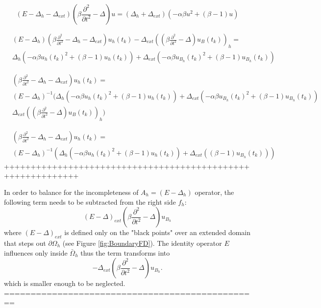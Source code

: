\documentclass[11pt,a4paper,twoside]{article}
\begin{document}
\begin{equation}
(E-\Delta_h -\Delta_{ext})(\beta \frac{ \partial^2 } { \partial t^2 } - \Delta) u =( \Delta_h + \Delta_{ext}) ( -\alpha \beta u^2  + (\beta -1)u) 
\end{equation}

\begin{align}
&(E-\Delta_h)(\beta \frac{ \partial^2 } { \partial t^2 } - \Delta_h - \Delta_{ext}) u_h(t_k) - \Delta_{ext}((\beta \frac{ \partial^2 } { \partial t^2 } - \Delta)u_B(t_k))_h = 
\\
&\Delta_h ( -\alpha \beta u_h(t_k)^2  + (\beta -1)u_h(t_k)) +  \Delta_{ext} ( -\alpha \beta u_{B_h}(t_k)^2  + (\beta -1)u_{B_h}(t_k))  
\end{align}

\begin{align}
&(\beta \frac{ \partial^2 } { \partial t^2 } - \Delta_h - \Delta_{ext}) u_h(t_k)  = 
\\
&(E-\Delta_h)^{-1} ( \Delta_h ( -\alpha \beta u_h(t_k)^2  + (\beta -1)u_h(t_k)) +  \Delta_{ext} ( -\alpha \beta u_{B_h}(t_k)^2  + (\beta -1)u_{B_h}(t_k))   \nonumber
\\
&\Delta_{ext}((\beta \frac{ \partial^2 } { \partial t^2 } - \Delta)u_B(t_k))_h )
\end{align}

\begin{align}
&(\beta \frac{ \partial^2 } { \partial t^2 } - \Delta_h - \Delta_{ext}) u_h(t_k)  = 
\\
&(E-\Delta_h)^{-1} ( \Delta_h ( -\alpha \beta u_h(t_k)^2  + (\beta -1)u_h(t_k)) +  \Delta_{ext} ( (\beta -1) u_{B_h}(t_k))  )
\end{align}
++++++++++++++++++++++++++++++++++++++++++++++++++++++++++++

In order to balance for the incompleteness of $A_h = (E-\Delta_h)$ operator, the following term needs to be subtracted from the right side $f_h$:
\begin{equation*}
(E-\Delta)_{ext}(\beta \frac{ \partial^2 } { \partial t^2 } - \Delta) u_{B_h}
\end{equation*}
where $(E-\Delta)_{ext}$ is defined only on the "black points" over an extended domain that steps out $\partial \Omega_h$ (see Figure \ref{fig:BoundaryFD}). The identity operator $E$ influences only inside $\bar \Omega_h$ thus the term transforms into
\begin{equation*}
-\Delta_{ext}(\beta \frac{ \partial^2 } { \partial t^2 } - \Delta) u_{B_h}.
\end{equation*}
which is smaller enough to be neglected.
================================================
\fi
\end{document}
